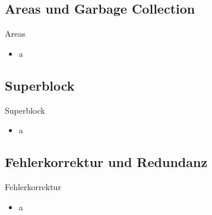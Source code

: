\documentclass[
	,footlinenumber
	,navline=true
	,footlineauthor
	,ngerman
	]{beamer}
\begin{document}
\subsection{Areas und Garbage Collection}
\begin{frame}{Areas}
	\begin{block}{}
		\begin{itemize}
			\item a
		\end{itemize}
	\end{block}
\end{frame}

\subsection{Superblock}
\begin{frame}{Superblock}
	\begin{block}{}
		\begin{itemize}
			\item a
		\end{itemize}
	\end{block}
\end{frame}

\subsection{Fehlerkorrektur und Redundanz}
\begin{frame}{Fehlerkorrektur}
	\begin{block}{}
		\begin{itemize}
			\item a
		\end{itemize}
	\end{block}
\end{frame}
\end{document}

